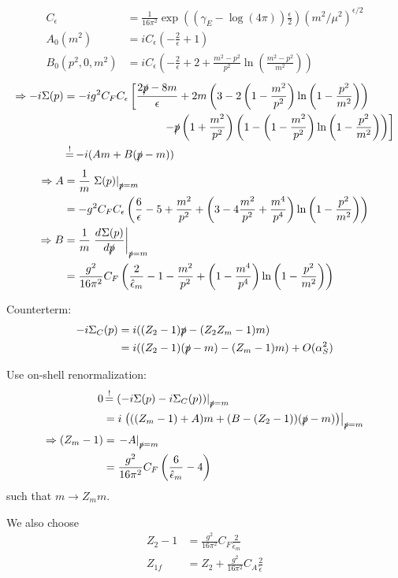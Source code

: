 \begin{align}
C_\epsilon &= \frac 1 {16\pi^2}\exp\left(\left(\gamma_E-\log(4\pi)\right)\frac{\epsilon} 2\right)\left(m^2/\mu^2\right)^{\epsilon/2}\\
A_0(m^2) &=iC_\epsilon\left(-\frac 2 {\epsilon}+1\right)\\
B_0(p^2,0,m^2) &=iC_\epsilon\left(-\frac 2{\epsilon}+2+\frac{m^2-p^2}{p^2}\ln\left(\frac{m^2-p^2}{m^2}\right)\right)
\end{align}
\begin{align}
\Rightarrow-i\Sigma(p) &= -ig^2C_FC_\epsilon\left[\frac{2\slashed{p}-8m}{\epsilon}+2m\left(3-2\left(1-\frac{m^2}{p^2}\right)\ln\left(1-\frac{p^2}{m^2}\right)\right)\right.\nonumber\\
 &\hspace{90pt}\left.-\slashed{p}\left(1+\frac{m^2}{p^2}\right)\left(1-\left(1-\frac{m^2}{p^2}\right)\ln\left(1-\frac{p^2}{m^2}\right)\right)\right]\\
 &\EqualClaim -i(A m + B(\slashed p - m))
\end{align}
\begin{align}
\Rightarrow A &= \frac 1 m \left.\Sigma(p)\right|_{\slashed{p}=m} \\
 &= -g^2C_F C_\epsilon\left(\frac 6 \epsilon -5 +\frac{m^2}{p^2}+\left(3-4\frac{m^2}{p^2}+\frac{m^4}{p^4}\right)\ln\left(1-\frac{p^2}{m^2}\right)\right)\\
\Rightarrow B &= \frac 1 m \left.\DeriveF{\slashed{p}}{\Sigma(p)}\right|_{\slashed{p}=m} \\
 &= \frac{g^2}{16\pi^2}C_F \left(\frac 2 {\hat\epsilon_m} -1-\frac{m^2}{p^2}+\left(1-\frac{m^4}{p^4}\right)\ln\left(1-\frac{p^2}{m^2}\right)\right)
\end{align}

Counterterm:
\begin{align}
-i\Sigma_C(p) &=i((Z_2-1)\slashed{p}-(Z_2 Z_m -1) m)\\
 &= i((Z_2-1)(\slashed p - m) - (Z_m-1)m) + O(\alpha_S^2)
\end{align}

Use on-shell renormalization:
\begin{align}
0 &\EqualClaim \left.\left(-i\Sigma(p)-i\Sigma_C(p)\right)\right|_{\slashed{p}=m}\\
 &= i\left.\left(((Z_m-1)+A)m+(B-(Z_2-1))(\slashed p - m)\right)\right|_{\slashed{p}=m} \\
\Rightarrow (Z_m-1) &= \left.-A\right|_{\slashed{p}=m}\\
 &= \frac{g^2}{16\pi^2}C_F \left(\frac 6 {\hat \epsilon_m} -4\right)
\end{align}
such that $m\rightarrow Z_m m$.

We also choose
\begin{align}
Z_2-1 &= \frac{g^2}{16\pi^2}C_F \frac 2 {\hat \epsilon_m}\\
Z_{1f} &= Z_2 + \frac{g^2}{16\pi^2}C_A\frac 2 {\hat \epsilon}
\end{align}
